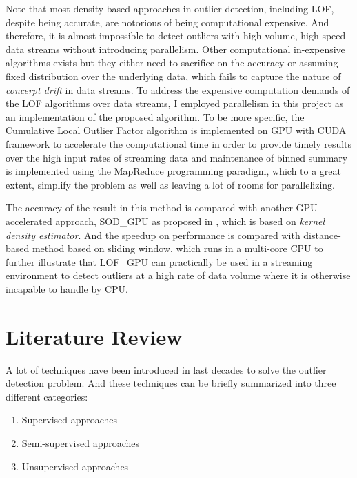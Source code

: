 \documentclass[11pt]{article}       %
\begin{document}
Note that most density-based approaches in outlier detection, including LOF, despite being accurate, are notorious of being computational expensive. And therefore, it is almost impossible to detect outliers with high volume, high speed data streams without introducing parallelism. Other computational in-expensive algorithms exists but they either need to sacrifice on the accuracy or assuming fixed distribution over the underlying data, which fails to capture the nature of \textit{concerpt drift} in data streams. To address the expensive computation demands of the LOF algorithms over data streams, I employed parallelism in this project as an implementation of the proposed algorithm. To be more specific, the Cumulative Local Outlier Factor algorithm is implemented on GPU with CUDA framework to accelerate the computational time in order to provide timely results over the high input rates of streaming data and maintenance of binned summary is implemented using the MapReduce programming paradigm, which to a great extent, simplify the problem as well as leaving a lot of rooms for parallelizing. 


The accuracy of the result in this method is compared with another GPU accelerated approach, SOD\_GPU as proposed in \cite{7516110}, which is based on \textit{kernel density estimator}. And the speedup on performance is compared with distance-based method based on sliding window, which runs in a multi-core CPU to further illustrate that LOF\_GPU can practically be used in a streaming environment to detect outliers at a high rate of data volume where it is otherwise incapable to handle by CPU. 


\section{Literature Review} \label{litrev}

A lot of techniques have been introduced in last decades to solve the outlier detection problem. And these techniques can be briefly summarized into three different categories: 

\begin{enumerate}
  \item Supervised approaches
  \item Semi-supervised approaches
  \item Unsupervised approaches
\end{enumerate}
\end{document}
